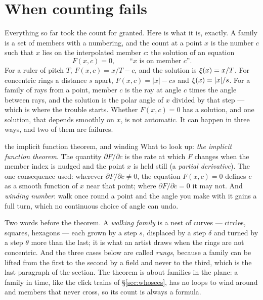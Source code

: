 \section{When counting fails}
\label{sec:counting}

Everything so far took the count for granted. Here is what it is, exactly.
A family is a set of members with a numbering, and the count at a point $x$
is the number $c$ such that $x$ lies on the interpolated member $c$: the
solution of an equation
\[
  F(x,c)=0,\qquad\text{``$x$ is on member $c$''.}
\]
For a ruler of pitch $T$, $F(x,c)=x/T-c$, and the solution is
$\xi(x)=x/T$. For concentric rings a distance $s$ apart, $F(x,c)=|x|-cs$
and $\xi(x)=|x|/s$. For a family of rays from a point, member $c$ is the
ray at angle $c$ times the angle between rays, and the solution is the
polar angle of $x$ divided by that step --- which is where the trouble
starts. Whether $F(x,c)=0$ has a solution, and one solution, that depends
smoothly on $x$, is not automatic. It can happen in three ways, and two of
them are failures.

\begin{lookup}{the implicit function theorem, and winding}
What to look up: \emph{the implicit function theorem}. The quantity
$\partial F/\partial c$ is the rate at which $F$ changes when the member
index is nudged and the point $x$ is held still (a \emph{partial
derivative}). The one consequence used: wherever $\partial F/\partial c\ne0$,
the equation $F(x,c)=0$ defines $c$ as a smooth function of $x$ near that
point; where $\partial F/\partial c=0$ it may not. And \emph{winding
number}: walk once round a point and the angle you make with it gains a
full turn, which no continuous choice of angle can undo.
\end{lookup}

Two words before the theorem. A \emph{walking family} is a nest of curves
--- circles, squares, hexagons --- each grown by a step $s$, displaced by a
step $\delta$ and turned by a step $\theta$ more than the last; it is what
an artist draws when the rings are not concentric. And the three cases
below are called \emph{rungs}, because a family can be lifted from the
first to the second by a field and never to the third, which is the last
paragraph of the section. The theorem is about families in the plane: a
family in time, like the click trains of \S\ref{sec:whosees}, has no loops
to wind around and members that never cross, so its count is always a
formula.

